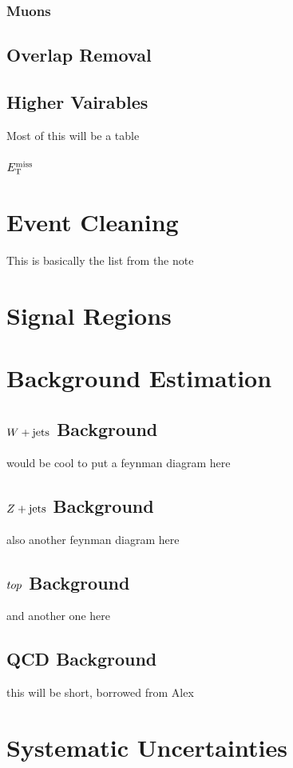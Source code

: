 \subsubsection{Muons}
\subsection{Overlap Removal}
\subsection{Higher Vairables}
Most of this will be a table
\subsubsection{$E_{\rm T}^{\rm miss}$}

\section{Event Cleaning}
This is basically the list from the note

\section{Signal Regions}

\section{Background Estimation}
\subsection{$W + \text{jets}$ Background}
would be cool to put a feynman diagram here
\subsection{$Z + \text{jets}$ Background}
also another feynman diagram here
\subsection{$top$ Background}
and another one here
\subsection{QCD Background}
this will be short, borrowed from Alex

\section{Systematic Uncertainties}
